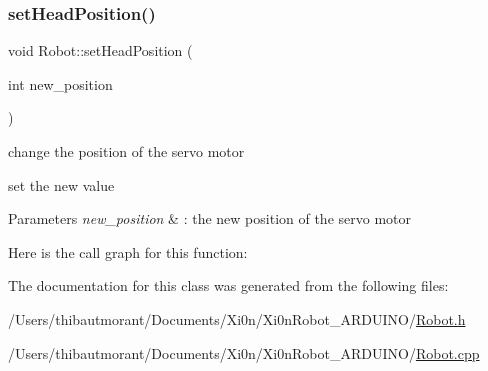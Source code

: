 \subsubsection{\texorpdfstring{set\+Head\+Position()}{setHeadPosition()}}
{\footnotesize\ttfamily void Robot\+::set\+Head\+Position (\begin{DoxyParamCaption}\item[{int}]{new\+\_\+position }\end{DoxyParamCaption})}



change the position of the servo motor 

set the new value


\begin{DoxyParams}{Parameters}
{\em new\+\_\+position} & \+: the new position of the servo motor \\
\hline
\end{DoxyParams}
Here is the call graph for this function\+:


The documentation for this class was generated from the following files\+:\begin{DoxyCompactItemize}
\item 
/\+Users/thibautmorant/\+Documents/\+Xi0n/\+Xi0n\+Robot\+\_\+\+A\+R\+D\+U\+I\+N\+O/\hyperlink{_robot_8h}{Robot.\+h}\item 
/\+Users/thibautmorant/\+Documents/\+Xi0n/\+Xi0n\+Robot\+\_\+\+A\+R\+D\+U\+I\+N\+O/\hyperlink{_robot_8cpp}{Robot.\+cpp}\end{DoxyCompactItemize}
